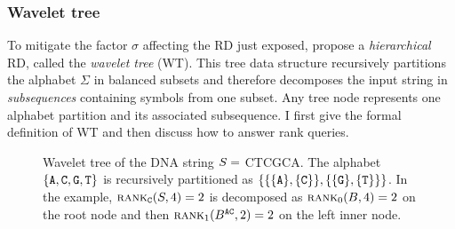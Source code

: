 
\subsubsection{Wavelet tree}

To mitigate the factor $\sigma$ affecting the RD just exposed, \cite{Grossi2003} propose a \emph{hierarchical} RD, called the \emph{wavelet tree} (WT).
This tree data structure recursively partitions the alphabet $\Sigma$ in balanced subsets and therefore decomposes the input string in \emph{subsequences} containing symbols from one subset.
Any tree node represents one alphabet partition and its associated subsequence.
I first give the formal definition of WT and then discuss how to answer rank queries.


\begin{figure}[b]
\begin{center}
\caption[Wavelet tree]{Wavelet tree of the DNA string $S=$ {\ttfamily CTCGCA}. The alphabet $\{\text{\ttfamily A},\text{\ttfamily C},\text{\ttfamily G},\text{\ttfamily T}\}$ is recursively partitioned as $\{\{\{\text{\ttfamily A}\},\{\text{\ttfamily C}\}\},\{\{\text{\ttfamily G}\},\{\text{\ttfamily T}\}\}\}$. In the example, $\textsc{rank}_{\text{\ttfamily C}}(S,4)=2$ is decomposed as $\textsc{rank}_0(B,4) = 2$ on the root node and then $\textsc{rank}_1(B^{\text{\ttfamily AC}}, 2) = 2$ on the left inner node.}
\label{fig:wt_dna}
\ttfamily

\end{center}
\end{figure}

